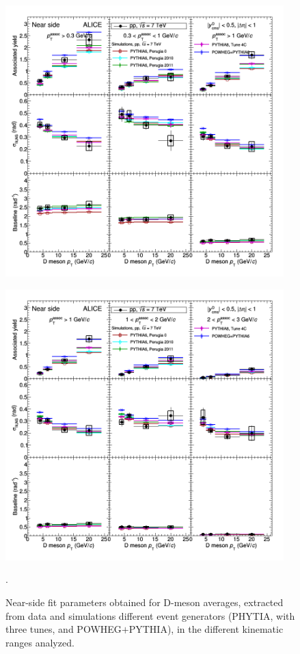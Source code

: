 \begin{figure}[h]
\centering
\includegraphics[width=0.96\textwidth]{figures/CfrPPandModels/ComparePPtoMCFitResults.png}
\end{figure}
\begin{figure}[h]
\centering
\includegraphics[width=0.96\textwidth]{figures/CfrPPandModels/ComparePPtoMCFitResults_2.png}
\caption{Near-side fit parameters obtained for D-meson averages, extracted from data and simulations different event generators (PHYTIA, with three tunes, and POWHEG$+$PYTHIA), in the different kinematic ranges analyzed.}.
\label{pp-models}
\end{figure}

